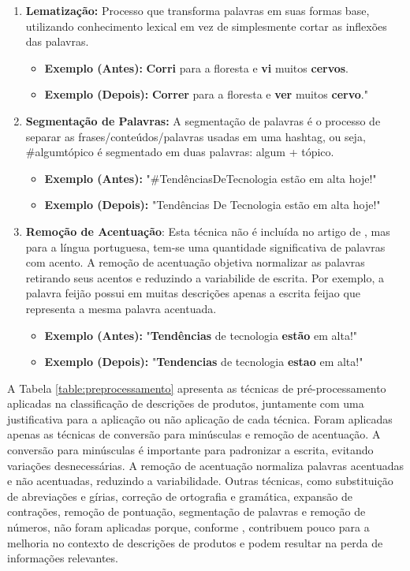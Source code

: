 \begin{enumerate}
    \item \textbf{Lematização:} Processo que transforma palavras em suas formas base, utilizando conhecimento lexical em vez de simplesmente cortar as inflexões das palavras.
    \begin{itemize}
        \item \textbf{Exemplo (Antes):} \textbf{Corri} para a floresta e \textbf{vi} muitos \textbf{cervos}.
        \item \textbf{Exemplo (Depois):} \textbf{Correr} para a floresta e \textbf{ver} muitos \textbf{cervo}."
    \end{itemize}
    \item \textbf{Segmentação de Palavras:} A segmentação de palavras é o processo de separar as frases/conteúdos/palavras usadas em uma hashtag, ou seja, \#algumtópico é segmentado em duas palavras: algum + tópico. 
    \begin{itemize}
        \item \textbf{Exemplo (Antes):} "\#TendênciasDeTecnologia estão em alta hoje!"
        \item \textbf{Exemplo (Depois):} "Tendências De Tecnologia estão em alta hoje!"
    \end{itemize}
    \item \textbf{Remoção de Acentuação}:  Esta técnica não é incluída no artigo de \cite{naseem2021survey}, mas para a língua portuguesa, tem-se uma quantidade significativa de palavras com acento.  A remoção de acentuação objetiva normalizar as palavras retirando seus acentos e reduzindo a variabilide de escrita.  Por exemplo, a palavra feijão possui em muitas descrições apenas a escrita feijao que representa a mesma palavra acentuada.
    \begin{itemize}
        \item \textbf{Exemplo (Antes):} "\textbf{Tendências} de tecnologia \textbf{estão} em alta!"
        \item \textbf{Exemplo (Depois):} "\textbf{Tendencias} de tecnologia \textbf{estao} em alta!"
    \end{itemize}      
\end{enumerate}

A Tabela \ref{table:preprocessamento} apresenta as técnicas de pré-processamento aplicadas na classificação de descrições de produtos, juntamente com uma justificativa para a aplicação ou não aplicação de cada técnica. Foram aplicadas apenas as técnicas de conversão para minúsculas e remoção de acentuação. A conversão para minúsculas é importante para padronizar a escrita, evitando variações desnecessárias. A remoção de acentuação normaliza palavras acentuadas e não acentuadas, reduzindo a variabilidade. Outras técnicas, como substituição de abreviações e gírias, correção de ortografia e gramática, expansão de contrações, remoção de pontuação, segmentação de palavras e remoção de números, não foram aplicadas porque, conforme \cite{naseem2021survey}, contribuem pouco para a melhoria no contexto de descrições de produtos e podem resultar na perda de informações relevantes.

